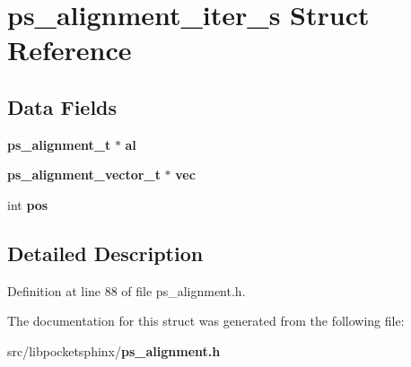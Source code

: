 \section{ps\-\_\-alignment\-\_\-iter\-\_\-s Struct Reference}
\label{structps__alignment__iter__s}
\subsection*{Data Fields}
\begin{DoxyCompactItemize}
\item 
{\bf ps\-\_\-alignment\-\_\-t} $\ast$ {\bfseries al}\label{structps__alignment__iter__s_a853af3f467b7b3e1465f0f1ea273ff3b}

\item 
{\bf ps\-\_\-alignment\-\_\-vector\-\_\-t} $\ast$ {\bfseries vec}\label{structps__alignment__iter__s_abeb4cf9260af4c9ad8d9ee7ba93dec14}

\item 
int {\bfseries pos}\label{structps__alignment__iter__s_a0d993e2df741893ac15b8e84bac32ca6}

\end{DoxyCompactItemize}


\subsection{Detailed Description}


Definition at line 88 of file ps\-\_\-alignment.\-h.



The documentation for this struct was generated from the following file\-:\begin{DoxyCompactItemize}
\item 
src/libpocketsphinx/{\bf ps\-\_\-alignment.\-h}\end{DoxyCompactItemize}
